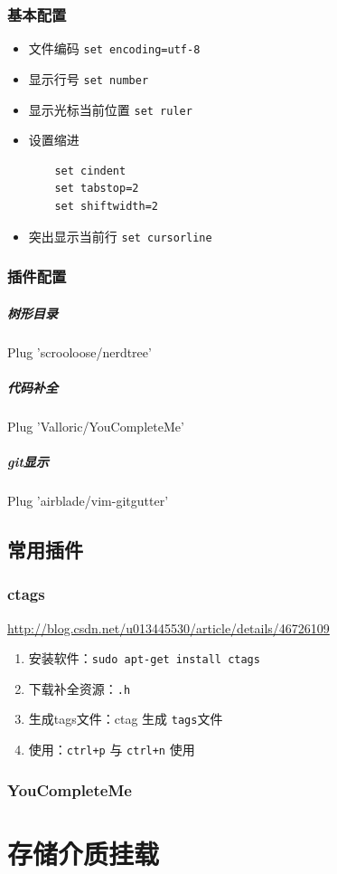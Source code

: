 \documentclass[UTF8,a4paper,12pt]{ctexbook}
\begin{document}
			\subsubsection{基本配置}
				\begin{itemize}
					\item 文件编码 \verb|set encoding=utf-8|
					\item 显示行号 \verb|set number|
					\item 显示光标当前位置 \verb|set ruler|
					\item 设置缩进 
					    \begin{lstlisting}
	set cindent	
	set tabstop=2
	set shiftwidth=2
					    \end{lstlisting}
				    
					\item  突出显示当前行 \verb|set cursorline|
				\end{itemize}
				
			\subsubsection{插件配置}
				\subparagraph{树形目录}Plug 'scrooloose/nerdtree'
				\subparagraph{代码补全}Plug 'Valloric/YouCompleteMe'
				\subparagraph{git显示}Plug 'airblade/vim-gitgutter'
							
		\subsection{常用插件}
			\subsubsection{ctags}
				\url{http://blog.csdn.net/u013445530/article/details/46726109}
				\begin{enumerate}
					\item 安装软件：\verb|sudo apt-get install ctags|
					\item 下载补全资源：\verb|.h|
					\item 生成tags文件：ctag 生成 \verb|tags|文件
					\item 使用：\verb|ctrl+p| 与 \verb|ctrl+n| 使用
				\end{enumerate}
				
			\subsubsection{YouCompleteMe}
				
	\section{存储介质挂载}
\end{document}
